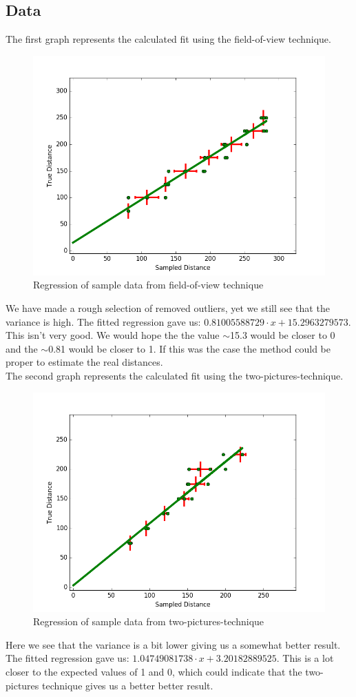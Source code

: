 \documentclass[a4paper,12pt]{article}
\begin{document}
\subsection{Data}
The first graph represents the calculated fit using the field-of-view technique.
\begin{figure}[!h]
\centering
\includegraphics[scale=0.65]{fov}
\caption{Regression of sample data from field-of-view technique}
\label{fig:fov}
\end{figure}
We have made a rough selection of removed outliers, yet we still see that the variance is high. The fitted regression gave us: $0.81005588729\cdot x + 15.2963279573$. This isn't very good. We would hope the the value $\sim$15.3 would be closer to 0 and the $\sim$0.81 would be closer to 1. If this was the case the method could be proper to estimate the real distances.
\\

The second graph represents the calculated fit using the two-pictures-technique.
\begin{figure}[!h]
\centering
\includegraphics[scale=0.75]{box}
\caption{Regression of sample data from two-pictures-technique}
\label{fig:box}
\end{figure}

Here we see that the variance is a bit lower giving us a somewhat better result. The fitted regression gave us: $1.04749081738\cdot x + 3.20182889525$. This is a lot closer to the expected values of 1 and 0, which could indicate that the two-pictures technique gives us a better better result.
\end{document}

